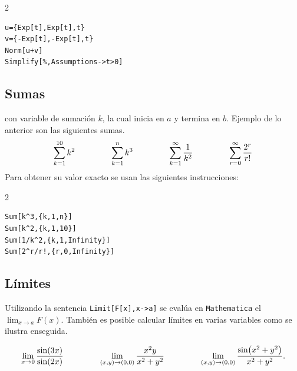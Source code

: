     \begin{tcolorbox}
      \begin{multicols}{2}
\begin{Verbatim}[formatcom=\letraverbatim]
u={Exp[t],Exp[t],t}
v={-Exp[t],-Exp[t],t}
Norm[u+v]
Simplify[%,Assumptions->t>0]
\end{Verbatim}
      \end{multicols}
    \end{tcolorbox}

    \subsection{Sumas}
     con variable de sumación $k$, la cual inicia en $a$ y termina en $b$. Ejemplo de lo anterior son las siguientes sumas.
    $$\sum_{k=1}^{10} k^2 \hskip1.5cm
    \sum_{k=1}^n k^3 \hskip1.5cm
    \sum_{k=1}^\infty \frac{1}{k^2} \hskip1.5cm
    \sum_{r=0}^\infty \frac{2^r}{r!}$$
    Para obtener su valor exacto se usan las siguientes instrucciones:

    \begin{tcolorbox}[title=Funciones \verb"Mathematica"]
      \begin{multicols}{2} %
\begin{Verbatim}[formatcom=\letraverbatim]
Sum[k^3,{k,1,n}]
Sum[k^2,{k,1,10}]
Sum[1/k^2,{k,1,Infinity}]
Sum[2^r/r!,{r,0,Infinity}]
\end{Verbatim}
      \end{multicols}
    \end{tcolorbox}

    \subsection{Límites}
    Utilizando la sentencia \verb"Limit[F[x],x->a]" se evalúa en \verb"Mathematica" el $\lim_{x\to a} F(x)$.
    También es posible calcular límites en varias variables como se ilustra enseguida.

    \begingroup
    \setlength{\abovedisplayskip}{0pt}
    \setlength{\abovedisplayshortskip}{0pt}
    \begin{equation*}
    \lim_{x\to0}\frac{\sin(3x)}{\sin(2x)}\hskip1.5cm
      \lim_{(x,y)\to (0,0)}\frac{x^2y}{x^2+y^2} \hskip1.5cm
    \lim_{(x,y)\to(0,0)}\frac{\sin(x^2+y^2)}{x^2+y^2}.
    \end{equation*}
    \endgroup

